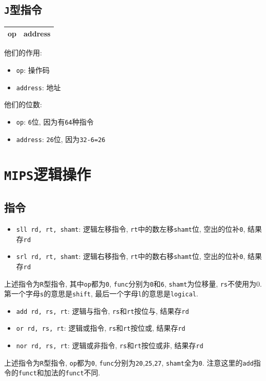 \subsection{\texttt{J}型指令}
\begin{table}[H]
\centering
\begin{tabularx}{\textwidth}{|Z|Z|}
\hline
op & address \\
\hline
\end{tabularx}
\end{table}\par
他们的作用:
\begin{itemize}
\item \verb|op|: 操作码
\item \verb|address|: 地址
\end{itemize}\par
他们的位数:
\begin{itemize}
\item \verb|op|: \verb|6|位, 因为有\verb|64|种指令
\item \verb|address|: \verb|26|位, 因为\verb|32-6=26|
\end{itemize}
\section{\texttt{MIPS}逻辑操作}
\subsection{指令}
\begin{itemize}
\item \verb|sll rd, rt, shamt|: 逻辑左移指令, \verb|rt|中的数左移\verb|shamt|位, 空出的位补\verb|0|, 结果存\verb|rd|
\item \verb|srl rd, rt, shamt|: 逻辑右移指令, \verb|rt|中的数右移\verb|shamt|位, 空出的位补\verb|0|, 结果存\verb|rd|
\end{itemize}\par
上述指令为\verb|R|型指令, 其中\verb|op|都为\verb|0|, \verb|func|分别为\verb|0|和\verb|6|, \verb|shamt|为位移量, \verb|rs|不使用为0. 第一个字母\verb|s|的意思是\verb|shift|, 最后一个字母\verb|l|的意思是\verb|logical|. \par \vspace{.5em}
\begin{itemize}
\item \verb|add rd, rs, rt|: 逻辑与指令, \verb|rs|和\verb|rt|按位与, 结果存\verb|rd|
\item \verb|or rd, rs, rt|: 逻辑或指令, \verb|rs|和\verb|rt|按位或, 结果存\verb|rd|
\item \verb|nor rd, rs, rt|: 逻辑或非指令, \verb|rs|和\verb|rt|按位或非, 结果存\verb|rd|
\end{itemize}\par
上述指令为\verb|R|型指令, \verb|op|都为\verb|0|, \verb|func|分别为\verb|20|,\verb|25|,\verb|27|, \verb|shamt|全为\verb|0|. 注意这里的\verb|add|指令的\verb|funct|和加法的\verb|funct|不同.
